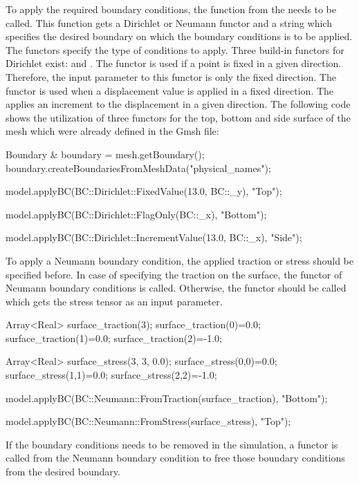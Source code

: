 To apply the required boundary conditions, the function 
from the  needs to be called. This function
gets a Dirichlet or Neumann functor and a string which specifies the
desired boundary on which the boundary conditions is to be
applied. The functors specify the type of conditions to apply. Three
build-in functors for Dirichlet exist: 
and . The functor  is used if a
point is fixed in a given direction. Therefore, the input parameter to
this functor is only the fixed direction. The 
functor is used when a displacement value is applied in a fixed
direction. The  applies an increment to the
displacement in a given direction. The following code shows the
utilization of three functors for the top, bottom and side surface of
the mesh which were already defined in the Gmsh file:

\begin{cpp}
Boundary & boundary = mesh.getBoundary();
boundary.createBoundariesFromMeshData("physical_names");

model.applyBC(BC::Dirichlet::FixedValue(13.0, BC::_y), "Top");

model.applyBC(BC::Dirichlet::FlagOnly(BC::_x), "Bottom");

model.applyBC(BC::Dirichlet::IncrementValue(13.0, BC::_x), "Side");
\end{cpp}

To apply a Neumann boundary condition, the applied traction or stress
should be specified before. In case of specifying the traction on the
surface, the functor  of Neumann boundary
conditions is called. Otherwise, the functor  should
be called which gets the stress tensor as an input parameter.

\begin{cpp}
Array<Real> surface_traction(3); 
surface_traction(0)=0.0;
surface_traction(1)=0.0; 
surface_traction(2)=-1.0;

Array<Real> surface_stress(3, 3, 0.0); 
surface_stress(0,0)=0.0;
surface_stress(1,1)=0.0; 
surface_stress(2,2)=-1.0;

model.applyBC(BC::Neumann::FromTraction(surface_traction), "Bottom");

model.applyBC(BC::Neumann::FromStress(surface_stress), "Top");
\end{cpp}

If the boundary conditions needs to be removed in the simulation, a
functor is called from the Neumann boundary condition to free those
boundary conditions from the desired boundary.

